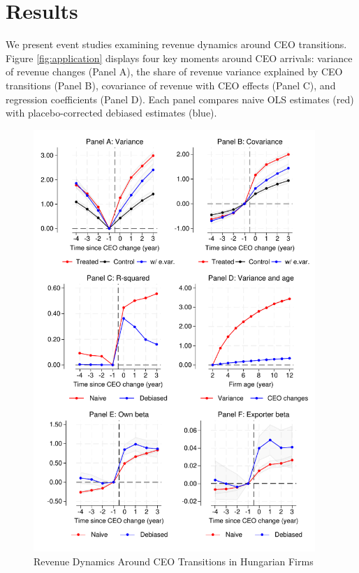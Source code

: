 \documentclass[11pt,a4paper]{article}
\begin{document}
\section{Results}

We present event studies examining revenue dynamics around CEO transitions. Figure \ref{fig:application} displays four key moments around CEO arrivals: variance of revenue changes (Panel A), the share of revenue variance explained by CEO transitions (Panel B), covariance of revenue with CEO effects (Panel C), and regression coefficients (Panel D). Each panel compares naive OLS estimates (red) with placebo-corrected debiased estimates (blue).

\begin{figure}[htbp]
\centering
\includegraphics[width=0.95\textwidth]{figure/application.pdf}
\caption{Revenue Dynamics Around CEO Transitions in Hungarian Firms}

\end{figure}
\end{document}
